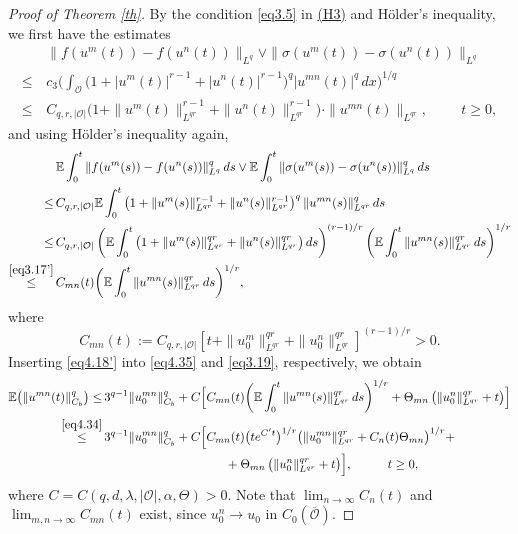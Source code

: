 \documentclass[10pt]{article}
\numberwithin{figure}{section}
\numberwithin{equation}{section}
\newcommand{\0}{{\theta}}
\def\Hs{\hspace{1cm}}\def\hs{\hspace{0.5cm}}
\begin{document}
\begin{proof}[Proof of Theorem \ref{th}]
By the condition \eqref{eq3.5} in \hyperref[H3]{(H3)} and H\"older's inequality, we first have the estimates
\begin{equation*}
\begin{split}
&\,\| f(u^m(t)) - f(u^n(t)) \|_{L^q}\vee\| \sigma(u^m(t)) - \sigma(u^n(t)) \|_{L^q}\\
\le&\, c_3\Big( \int_\mathcal{O} \big(1+|u^m(t)|^{r-1}+|u^n(t)|^{r-1}\big)^q |u^{mn}(t)|^q \,dx \Big)^{1/q} \\
\le&\,  C_{q,r,|\mathcal{O}|}\big( 1+\|u^m(t)\|_{L^{qr}}^{r-1}+\|u^n(t)\|_{L^{qr}}^{r-1} \big) \cdot \|u^{mn}(t)\|_{L^{qr}},\Hs t\ge0,
\end{split}
\end{equation*}
and using H\"older's inequality again,
\begin{equation}\label{eq4.18'}
\begin{split}
&\, \mathbb{E}\int_0^t \| f(u^m(s)) - f(u^n(s)) \|_{L^q}^q \, ds
   \vee \mathbb{E}\int_0^t \| \sigma(u^m(s)) - \sigma(u^n(s)) \|_{L^q}^q \, ds \\
\le&\, C_{q,r,|\mathcal{O}|}\mathbb{E}\int_0^t \big( 1 + \|u^m(s)\|_{L^{qr}}^{r-1} + \|u^n(s)\|_{L^{qr}}^{r-1} \big)^{q} \,
   \|u^{mn}(s)\|_{L^{qr}}^q \, ds \\
\le&\, C_{q,r,|\mathcal{O}|}\left( \mathbb{E}\int_0^t \big( 1 + \|u^m(s)\|_{L^{qr}}^{qr} + \|u^n(s)\|_{L^{qr}}^{qr} \big) \, ds \right)^{(r-1)/r}
      \left( \mathbb{E}\int_0^t \|u^{mn}(s)\|_{L^{qr}}^{qr} \, ds \right)^{1/r}\\
\stackrel{\eqref{eq3.17'}}{\le}&\, C_{mn}(t)\bigg( \mathbb{E}\int_0^t \|u^{mn}(s)\|_{L^{qr}}^{qr} \, ds \bigg)^{1/r},
\end{split}
\end{equation}
where 
$$
C_{mn}(t):= C_{q,r,|\mathcal{O}|} \left[ t+ \|u_0^m\|_{L^{qr}}^{qr}+\|u_0^n\|_{L^{qr}}^{qr} \right]^{(r-1)/r}>0.
$$
Inserting \eqref{eq4.18'} into \eqref{eq4.35} and \eqref{eq3.19}, respectively,  we obtain 
\begin{equation}\label{eq4.7}
\begin{split}
\mathbb{E} \big(\| u^{mn}(t) \|_{C_b}^q\big) 
\le&\, 3^{q-1} \|u_0^{mn}\|_{C_b}^q
   + C\Big[C_{mn}(t)\bigg( \mathbb{E}\int_0^t \|u^{mn}(s)\|_{L^{qr}}^{qr} \, ds \bigg)^{1/r}+\Theta_{mn}\,
        \big(\|u_0^n\|_{L^{qr}}^{qr}+t \big)\Big]\\
\stackrel{\eqref{eq4.34}}{\le}&\, 3^{q-1} \|u_0^{mn}\|_{C_b}^q+ C \Big[C_{mn}(t)\big(t e^{C't}\big)^{1/r}\big(  \|u^{mn}_0\|_{L^{qr}}^{qr}+ C_n(t)\Theta_{mn} \big)^{1/r} +\\
&\Hs\Hs\Hs\hs+\Theta_{mn}\,
        \big(\|u_0^n\|_{L^{qr}}^{qr}+t \big)\Big],\Hs t\ge0,
\end{split}
\end{equation}
where $C = C(q,d,\lambda,|\mathcal{O}|,\alpha,\Theta) > 0$. 
Note that $\lim_{n\to\infty}C_n(t)$ and $\lim_{m,n\to\infty}C_{mn}(t)$ exist, since $u_0^n \to u_0$ in $C_0(\overline{\mathcal{O}})$. 


\end{proof}
\end{document}
